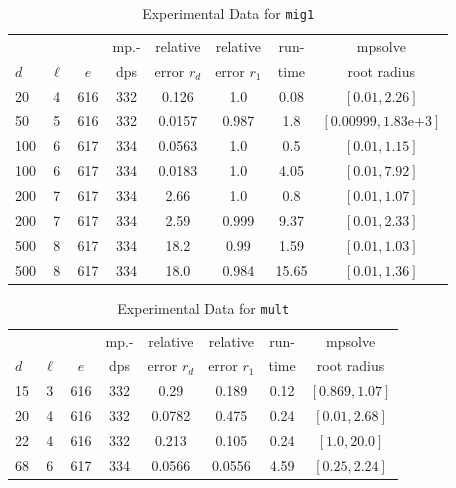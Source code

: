 \documentclass[runningheads]{llncs}
\begin{document}
\begin{table}
\caption{Experimental Data for \texttt{mig1}} %
\label{tab:mig1}
\vskip -0.15in
\begin{center}
\begin{small}
\begin{sc}
\begin{tabular}{lccccccc}
\toprule
&  &  & mp.-& relative  & relative & run- & mpsolve \\
$d$& $\ell$& $e$ & dps&error $r_d$       & error $r_1$ &time& root radius\\
\midrule
 20 & 4 & 616 & 332 & 0.126 & 1.0 & 0.08 & $[0.01, 2.26]$\\
  50 & 5 & 616 & 332 & 0.0157 & 0.987 & 1.8 & $[0.00999, 1.83\text{e+}3]$\\
 100 & 6 & 617 & 334 & 0.0563 & 1.0 & 0.5 & $[0.01, 1.15]$\\
 100 & 6 & 617 & 334 & 0.0183 & 1.0 & 4.05 & $[0.01, 7.92]$\\
 200 & 7 & 617 & 334 & 2.66 & 1.0 & 0.8 & $[0.01, 1.07]$\\
 200 & 7 & 617 & 334 & 2.59 & 0.999 & 9.37 & $[0.01, 2.33]$\\
 500 & 8 & 617 & 334 & 18.2 & 0.99 & 1.59 & $[0.01, 1.03]$\\
 500 & 8 & 617 & 334 & 18.0 & 0.984 & 15.65 & $[0.01, 1.36]$\\ %
\bottomrule
\end{tabular}
\end{sc}
\end{small}
\end{center}
\vskip 0.05in
\end{table}


\begin{table}
\caption{Experimental Data for \texttt{mult}} %
\label{tab:mult}
\vskip -0.15in
\begin{center}
\begin{small}
\begin{sc}
\begin{tabular}{lccccccc}
\toprule
&  &  & mp.-& relative  & relative & run- & mpsolve \\
$d$& $\ell$& $e$ & dps&error $r_d$       & error $r_1$ &time& root radius\\
\midrule
 15 & 3 & 616 & 332 & 0.29 & 0.189 & 0.12 & $[0.869, 1.07]$\\
 20 & 4 & 616 & 332 & 0.0782 & 0.475 & 0.24 & $[0.01, 2.68]$\\
 22 & 4 & 616 & 332 & 0.213 & 0.105 & 0.24 & $[1.0, 20.0]$\\
  68 & 6 & 617 & 334 & 0.0566 & 0.0556 & 4.59 & $[0.25, 2.24]$\\
\bottomrule
\end{tabular}
\end{sc}
\end{small}
\end{center}
\vskip 0.05in
\end{table}
\end{document}
